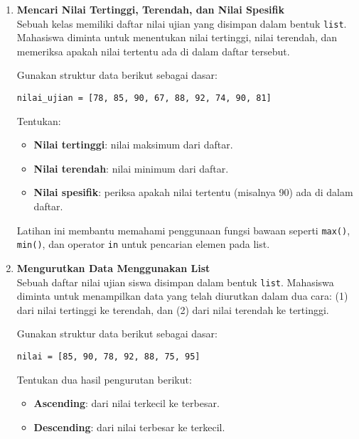 \begin{enumerate}

\item \textbf{Mencari Nilai Tertinggi, Terendah, dan Nilai Spesifik} \\
Sebuah kelas memiliki daftar nilai ujian yang disimpan dalam bentuk \texttt{list}. 
Mahasiswa diminta untuk menentukan nilai tertinggi, nilai terendah, 
dan memeriksa apakah nilai tertentu ada di dalam daftar tersebut.  

Gunakan struktur data berikut sebagai dasar:

\begin{lstlisting}[style=PythonStyle]
nilai_ujian = [78, 85, 90, 67, 88, 92, 74, 90, 81]
\end{lstlisting}

Tentukan:
\begin{itemize}
  \item \textbf{Nilai tertinggi}: nilai maksimum dari daftar.
  \item \textbf{Nilai terendah}: nilai minimum dari daftar.
  \item \textbf{Nilai spesifik}: periksa apakah nilai tertentu (misalnya 90) ada di dalam daftar.
\end{itemize}


Latihan ini membantu memahami penggunaan fungsi bawaan seperti 
\texttt{max()}, \texttt{min()}, dan operator \texttt{in} untuk pencarian elemen pada list.

\item \textbf{Mengurutkan Data Menggunakan List} \\
Sebuah daftar nilai ujian siswa disimpan dalam bentuk \texttt{list}. 
Mahasiswa diminta untuk menampilkan data yang telah diurutkan dalam dua cara:  
(1) dari nilai tertinggi ke terendah, dan  
(2) dari nilai terendah ke tertinggi.

Gunakan struktur data berikut sebagai dasar:

\begin{lstlisting}[style=PythonStyle]
nilai = [85, 90, 78, 92, 88, 75, 95]
\end{lstlisting}

Tentukan dua hasil pengurutan berikut:
\begin{itemize}
  \item \textbf{Ascending}: dari nilai terkecil ke terbesar.
  \item \textbf{Descending}: dari nilai terbesar ke terkecil.
\end{itemize}


\end{enumerate}
